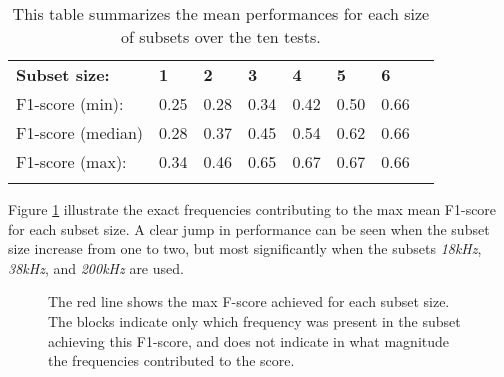 \begin{longtable}{llllllll}
\caption[Summary exhaustive search]{This table summarizes the mean performances for each size of subsets over the ten tests. }\\
                  &      &      &      &      &      &      &  \\ \hline
\endfirsthead
%
\endhead
%
\hline
\endfoot
%
\endlastfoot
%
\textbf{Subset size:}      & \textbf{1}    & \textbf{2}    & \textbf{3}    & \textbf{4}    & \textbf{5}    & \textbf{6}    &  \\ \hline
F1-score (min):   & 0.25 & 0.28 & 0.34 & 0.42 & 0.50 & 0.66 &  \\
F1-score (median) & 0.28 & 0.37 & 0.45 & 0.54 & 0.62 & 0.66 &  \\
F1-score (max):   & 0.34 & 0.46 & 0.65 & 0.67 & 0.67 & 0.66 &  \\ \hline
\label{summary_per_subset_size_table}

\end{longtable}

Figure \ref{increasing_freq_f1_score_fig} illustrate the exact frequencies contributing to the max mean F1-score for each subset size. A clear jump in performance can be seen when the subset size increase from one to two, but most significantly when the subsets \textit{18kHz}, \textit{38kHz}, and \textit{200kHz} are used.

        \begin{figure}[H]
            \centering
            
            \caption[Best frequency combination - F1-score]{The red line shows the max F-score achieved for each subset size. The blocks indicate only which frequency was present in the subset achieving this F1-score, and does not indicate in what magnitude the frequencies contributed to the score.}
          	\medskip 
            \label{increasing_freq_f1_score_fig}
        \end{figure}


